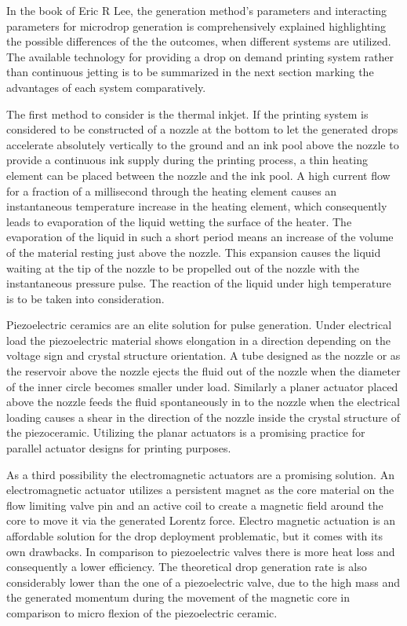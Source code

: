 In the book of Eric R Lee, the generation method's parameters and interacting parameters for microdrop generation is comprehensively explained highlighting the possible differences of the the outcomes, when different systems are utilized. The available technology for providing a drop on demand printing system rather than continuous jetting is to be summarized in the next section marking the advantages of each system comparatively.  

The first method to consider is the thermal inkjet.  If the printing system is considered to be constructed of a nozzle at the bottom to let the generated drops accelerate absolutely vertically to the ground and an ink pool above the nozzle to provide a continuous ink supply during the printing process, a thin heating element can be placed between the nozzle and the ink pool. A high current flow for a fraction of a millisecond through the heating element causes an instantaneous temperature increase in the heating element, which consequently leads to evaporation of the liquid wetting the surface of the heater. The evaporation of the liquid in such a short period means an increase of the volume of the material resting just above the nozzle. This expansion causes the liquid waiting at the tip of the nozzle to be propelled out of the nozzle with the instantaneous pressure pulse. The reaction of the liquid under high temperature is to be taken into consideration.

Piezoelectric ceramics are an elite solution for pulse generation. Under electrical load the piezoelectric material shows elongation in a direction depending on the voltage sign and crystal structure orientation. A tube designed as the nozzle or as the reservoir above the nozzle ejects the fluid out of the nozzle when the diameter of the inner circle becomes smaller under load. Similarly a planer actuator placed above the nozzle feeds the fluid spontaneously in to the nozzle when the electrical loading causes a shear in the direction of the nozzle inside the crystal structure of the piezoceramic. Utilizing the planar actuators is a promising practice for parallel actuator designs for printing purposes.\citep{lee2002microdrop}

As a third possibility the electromagnetic actuators are a promising solution. An electromagnetic actuator utilizes a persistent magnet as the core material on the flow limiting valve pin and an active coil to create a magnetic field around the core to move it via the generated Lorentz force. Electro magnetic actuation is an affordable solution for the drop deployment problematic, but it comes with its own drawbacks. In comparison to piezoelectric valves there is more heat loss and consequently a lower efficiency. The theoretical drop generation rate is also considerably lower than the one of a piezoelectric valve, due to the high mass and the generated momentum during the movement of the magnetic core in comparison to micro flexion of the piezoelectric ceramic.\citep{nguyen2002fundamentals}


